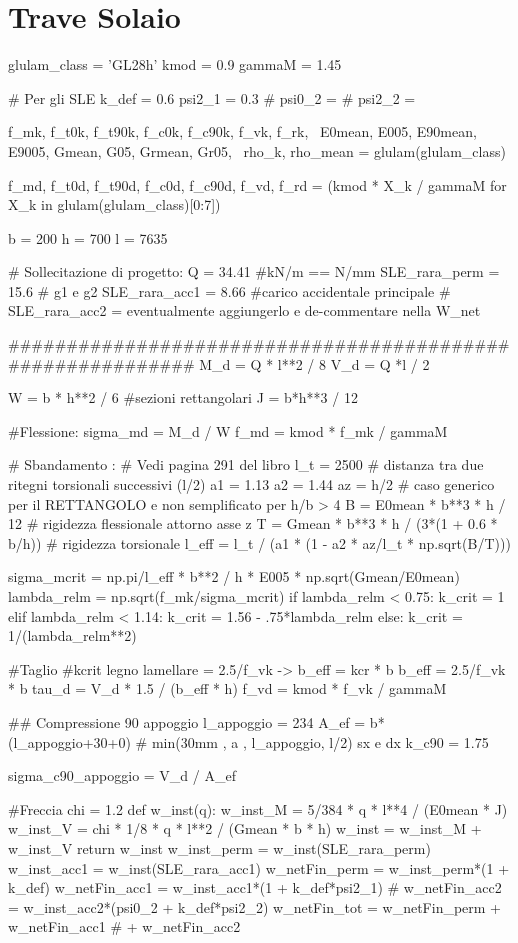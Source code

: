 \section{Trave Solaio}
\begin{pycode}[TraveSolaio]
glulam_class = 'GL28h'
kmod = 0.9
gammaM = 1.45

# Per gli SLE
k_def = 0.6
psi2_1 = 0.3
# psi0_2 =
# psi2_2 =

f_mk, f_t0k, f_t90k, f_c0k, f_c90k, f_vk, f_rk, \
E0mean, E005, E90mean, E9005, Gmean, G05, Grmean, Gr05, \
rho_k, rho_mean = glulam(glulam_class)

f_md, f_t0d, f_t90d, f_c0d, f_c90d, f_vd, f_rd = (kmod * X_k / gammaM for X_k in glulam(glulam_class)[0:7])

b = 200
h = 700
l = 7635

# Sollecitazione di progetto:
Q = 34.41 #kN/m == N/mm
SLE_rara_perm = 15.6 # g1 e g2
SLE_rara_acc1 = 8.66 #carico accidentale principale
# SLE_rara_acc2 =  eventualmente aggiungerlo e de-commentare nella W_net

###########################################################
M_d = Q * l**2 / 8
V_d = Q *l / 2

W = b * h**2 / 6 #sezioni rettangolari
J = b*h**3 / 12

#Flessione:
sigma_md = M_d / W
f_md = kmod * f_mk / gammaM

# Sbandamento :
# Vedi pagina 291 del libro
l_t = 2500 # distanza tra due ritegni torsionali successivi (l/2)
a1 = 1.13
a2 = 1.44
az = h/2
# caso generico per il RETTANGOLO e non semplificato per h/b > 4
B = E0mean * b**3 * h / 12 # rigidezza flessionale attorno asse z
T = Gmean * b**3 * h / (3*(1 + 0.6 * b/h)) # rigidezza torsionale 
l_eff = l_t / (a1 * (1 - a2 * az/l_t * np.sqrt(B/T)))

sigma_mcrit = np.pi/l_eff * b**2 / h * E005 * np.sqrt(Gmean/E0mean)
lambda_relm = np.sqrt(f_mk/sigma_mcrit)
if lambda_relm < 0.75:
    k_crit = 1
elif lambda_relm < 1.14:
    k_crit = 1.56 - .75*lambda_relm
else:
    k_crit = 1/(lambda_relm**2)


#Taglio    
#kcrit legno lamellare = 2.5/f_vk -> b_eff = kcr * b
b_eff = 2.5/f_vk * b
tau_d = V_d * 1.5 / (b_eff * h)
f_vd = kmod * f_vk / gammaM

## Compressione 90 appoggio
l_appoggio = 234 
A_ef = b* (l_appoggio+30+0) # min(30mm , a , l_appoggio, l/2) sx e dx
k_c90 = 1.75

sigma_c90_appoggio = V_d / A_ef

#Freccia
chi = 1.2
def w_inst(q): 
    w_inst_M = 5/384 * q * l**4 / (E0mean * J)
    w_inst_V = chi * 1/8 * q * l**2 / (Gmean * b * h)
    w_inst = w_inst_M + w_inst_V
    return w_inst
w_inst_perm = w_inst(SLE_rara_perm)
w_inst_acc1 = w_inst(SLE_rara_acc1)
w_netFin_perm = w_inst_perm*(1 + k_def)
w_netFin_acc1 = w_inst_acc1*(1 + k_def*psi2_1)
# w_netFin_acc2 = w_inst_acc2*(psi0_2 + k_def*psi2_2)
w_netFin_tot = w_netFin_perm + w_netFin_acc1 # + w_netFin_acc2

\end{pycode}

